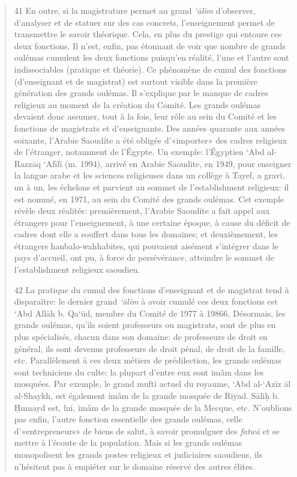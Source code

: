 \begin{quote}
41 En outre, si la magistrature permet au grand \emph{`ālim} d'observer,
d'analyser et de statuer sur des cas concrets, l'enseignement permet de
transmettre le savoir théorique. Cela, en plus du prestige qui entoure
ces deux fonctions. Il n'est, enfin, pas étonnant de voir que nombre de
grands oulémas cumulent les deux fonctions puisqu'en réalité, l'une et
l'autre sont indissociables (pratique et théorie). Ce phénomène de cumul
des fonctions (d'enseignant et de magistrat) est surtout visible dans la
première génération des grands oulémas. Il s'explique par le manque de
cadres religieux au moment de la
création du Comité. Les grands oulémas devaient donc assumer, tout à la
fois, leur rôle au sein du Comité et les fonctions de magistrats et
d'enseignants. Des années quarante aux années soixante, l'Arabie
Saoudite a été obligée d'«importer» des cadres religieux de l'étranger,
notamment de l'Égypte. Un exemple: l'Égyptien `Abd al-Razzāq `Afīfī (m.
1994), arrivé en Arabie Saoudite, en 1949, pour enseigner la langue
arabe et les sciences religieuses dans un collège à Tayef, a gravi, un à
un, les échelons et parvient au sommet de l'establishment religieux: il
est nommé, en 1971, au sein du Comité des grands oulémas. Cet exemple
révèle deux réalités: premièrement, l'Arabie Saoudite a fait appel aux
étrangers pour l'enseignement, à une certaine époque, à cause du déficit
de cadres dont elle a souffert dans tous les domaines; et deuxièmement,
les étrangers hanbalo-wahhabites, qui pouvaient aisément s'intégrer dans
le pays d'accueil, ont pu, à force de persévérance, atteindre le sommet
de l'establishment religieux saoudien.

42 La pratique du cumul des fonctions d'enseignant et de magistrat tend
à disparaître: le dernier grand \emph{`ālim} à avoir cumulé ces deux
fonctions est `Abd Allāh b. Qa`ūd, membre du Comité de 1977 à
19866\emph{.} Désormais, les grands oulémas, qu'ils soient professeurs
ou magistrats, sont de plus en plus spécialisés, chacun dans son
domaine: de professeurs de droit en général, ils sont devenus
professeurs de droit pénal, de droit de la famille, etc. Parallèlement à
ces deux métiers de prédilection, les grands oulémas sont techniciens du
culte: la plupart d'entre eux sont imâm dans les mosquées. Par exemple,
le grand mufti actuel du royaume, `Abd al-`Azīz āl al-Shaykh, est
également imâm de la grande mosquée de Riyad. Sāliḥ b. Ḥumayd est, lui,
imâm de la grande mosquée de la Mecque, etc. N'oublions pas enfin,
l'autre fonction essentielle des grands oulémas, celle d'«entrepreneurs»
de biens de salut, à savoir promulguer des \emph{fatwā} et se mettre à
l'écoute de la population. Mais si les grands oulémas monopolisent les
grands postes religieux et judiciaires saoudiens, ils n'hésitent pas à
empiéter sur le domaine réservé des autres élites.


\end{quote}
